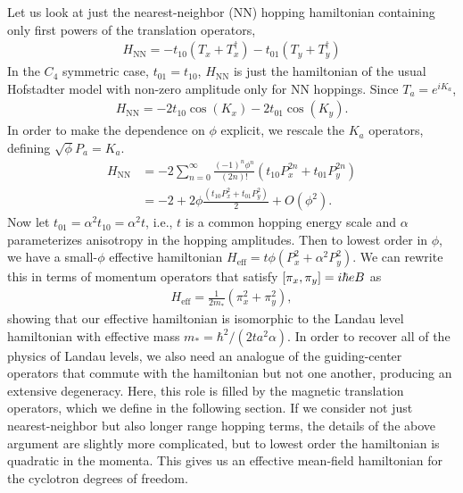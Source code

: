 \documentclass[aps,prb,twocolumn,letterpaper,twoside,nobalancelastpage,groupedaddress,amsmath,amssymb,floatfix,citeautoscript]{revtex4-1}
\begin{document}
Let us look at just the nearest-neighbor (NN) hopping hamiltonian containing only first powers of the translation operators,
\begin{align*}
H_{\text{NN}} = -t_{10}\left(T_x + T_x^{\dag}\right) - t_{01}\left(T_y + T_y^{\dag}\right)
\end{align*}
In the $C_4$ symmetric case, $t_{01} = t_{10}$, $H_{\text{NN}}$ is just the hamiltonian of the usual Hofstadter model with non-zero amplitude only for NN hoppings. Since $T_a = e^{iK_a}$,
\begin{align*}
H_{\text{NN}}= -2t_{10}\cos\left(K_x\right) - 2 t_{01}\cos\left(K_y\right).
\end{align*}
In order to make the dependence on $\phi$ explicit, we rescale the $K_a$ operators, defining $\sqrt{\phi} P_a = K_a$. 
\begin{align*}
H_{\text{NN}} &= -2\sum_{n=0}^{\infty}  \frac{(-1)^{n}\phi^{n}}{(2n)!} \left(t_{10} P^{2n}_x + t_{01}P^{2n}_y\right)\\
&= -2 + 2\phi\frac{\left(t_{10} P^{2}_x + t_{01} P^{2}_y\right)}{2} +O(\phi^2).
\end{align*}
Now let $t_{01} = \alpha^2 t_{10} = \alpha^2 t$, i.e., $t$ is a common hopping energy scale and $\alpha$ parameterizes anisotropy in the hopping amplitudes. Then to lowest order in $\phi$, we have a small-$\phi$ effective hamiltonian $H_{\text{eff}}= t\phi \left(P^{2}_x + \alpha^2P^{2}_y\right)$. We can rewrite this in terms of momentum operators that satisfy $\comm{\pi_x}{\pi_y} = i\hbar e B$ as
\begin{align*}
H_{\text{eff}} = \frac{1}{2m_{\ast}}\left(\pi_x^2 + \pi_y^2\right),
\end{align*}
showing that our effective hamiltonian is isomorphic to the Landau level hamiltonian with effective mass $m_{\ast} = \hbar^2/(2ta^2\alpha)$. In order to recover all of the physics of Landau levels, we also need an analogue of the guiding-center operators that commute with the hamiltonian but not one another, producing an extensive degeneracy. Here, this role is filled by the magnetic translation operators, which we define in the following section. If we consider not just nearest-neighbor but also longer range hopping terms, the details of the above argument are slightly more complicated, but to lowest order the hamiltonian is quadratic in the momenta. This gives us an effective mean-field hamiltonian for the cyclotron degrees of freedom. 
\end{document}
